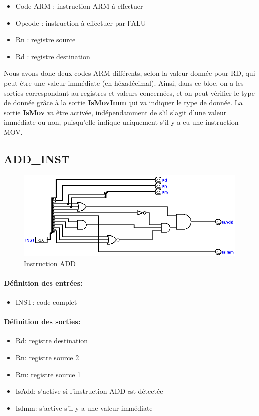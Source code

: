 \documentclass[a4paper]{article} %
\begin{document}
\begin{itemize}
    \item     Code ARM : instruction ARM à effectuer
    \item     Opcode : instruction à effectuer par l'ALU
    \item     Rn : registre source
    \item     Rd : registre destination
\end{itemize}

\medskip
Nous avons donc deux codes ARM différents, selon la valeur donnée pour RD, qui peut être une valeur immédiate (en héxadécimal). Ainsi, dans ce bloc, on a les sorties correspondant au registres et valeurs concernées, et on peut vérifier le type de donnée grâce à la sortie \textbf{IsMovImm} qui va indiquer le type de donnée. La sortie \textbf{IsMov} va être activée, indépendamment de s'il s'agit d'une valeur immédiate ou non, puisqu'elle indique uniquement s'il y a eu une instruction MOV.



\subsection{ADD\_INST} \label{addinst}
\begin{figure}[H]
    \centering
    \includegraphics[width=.8\textwidth]{src/Et4_ADD_INST.png}
    \caption{Instruction ADD}
    \label{add_img}
\end{figure}

\paragraph{Définition des entrées:}
\begin{itemize}
    \item     INST: code complet
\end{itemize}

\paragraph{Définition des sorties:}
\begin{itemize}
    \item     Rd: registre destination
    \item     Rn: registre source 2
    \item     Rm: registre source 1
    \item     IsAdd: s'active si l'instruction ADD est détectée
    \item     IsImm: s'active s'il y a une valeur immédiate
\end{itemize}
\medskip 
\end{document}
